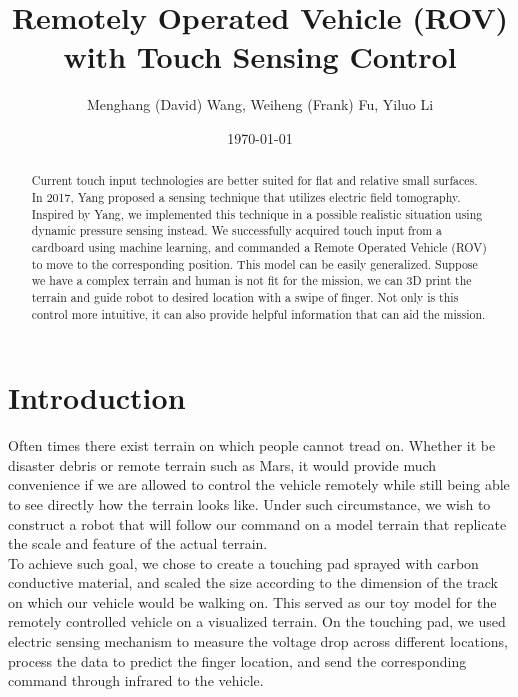 \documentclass[reprint,amsmath, amsfonts, amssymb, aps, letterpaper]{revtex4-1}
\begin{document}
\title{Remotely Operated Vehicle (ROV) with Touch Sensing Control}
\author{Menghang (David) Wang, Weiheng (Frank) Fu, Yiluo Li}

\date{\today}



\begin{abstract}
Current touch input technologies are better suited for flat and relative small surfaces. In 2017, Yang \citep{electrick} proposed a sensing technique that utilizes electric field tomography. Inspired by Yang, we implemented this technique in a possible realistic situation using dynamic pressure sensing instead. We successfully acquired touch input from a cardboard using machine learning, and commanded a Remote Operated Vehicle (ROV) to move to the corresponding position. This model can be easily generalized. Suppose we have a complex terrain and human is not fit for the mission, we can 3D print the terrain and guide robot to desired location with a swipe of finger. Not only is this control more intuitive, it can also provide helpful information that can aid the mission.
\end{abstract}

\maketitle

\section{Introduction}
Often times there exist terrain on which people cannot tread on. Whether it be disaster debris or remote terrain such as Mars, it would provide much convenience if we are allowed to control the vehicle remotely while still being able to see directly how the terrain looks like. Under such circumstance, we wish to construct a robot that will follow our command on a model terrain that replicate the scale and feature of the actual terrain.
\\\indent To achieve such goal, we chose to create a touching pad sprayed with carbon conductive material, and scaled the size according to the dimension of the track on which our vehicle would be walking on. This served as our toy model for the remotely controlled vehicle on a visualized terrain. On the touching pad, we used electric sensing mechanism to measure the voltage drop across different locations, process the data to predict the finger location, and send the corresponding command through infrared to the vehicle.
\end{document}
